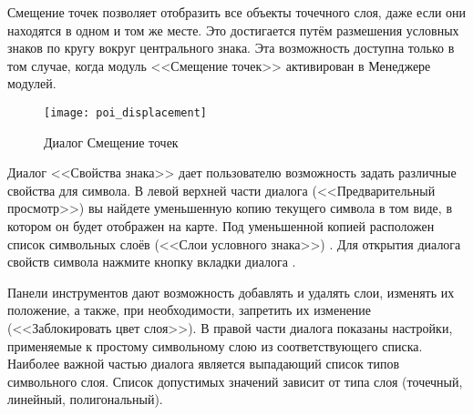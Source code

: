 
Смещение точек позволяет отобразить все объекты точечного слоя, даже если
они находятся в одном и том же месте. Это достигается путём размешения
условных знаков по кругу вокруг центрального знака. Эта возможность доступна
только в том случае, когда модуль <<Смещение точек>> активирован в Менеджере
модулей.

\begin{figure}[ht]
   \centering
   \texttt{[image: poi\_displacement]}
   \caption{Диалог Смещение точек \wincaption}\label{fig:poidissymNG}
\end{figure}


Диалог <<Свойства знака>> дает пользователю возможность задать различные
свойства для символа. В левой верхней части диалога (<<Предварительный
просмотр>>)  вы найдете уменьшенную копию текущего символа в том виде,
в котором он будет отображен на карте. Под уменьшенной копией расположен
список символьных слоёв (<<Слои условного знака>>) . Для открытия диалога
свойств символа нажмите кнопку 
вкладки  диалога .

Панели инструментов дают возможность добавлять и удалять слои, изменять их
положение, а также, при необходимости, запретить их изменение
(<<Заблокировать цвет слоя>>). В правой части диалога показаны настройки,
применяемые к простому символьному слою из соответствующего списка. Наиболее
важной частью диалога является выпадающий список типов символьного слоя.
Список допустимых значений зависит от типа слоя (точечный, линейный,
полигональный).

